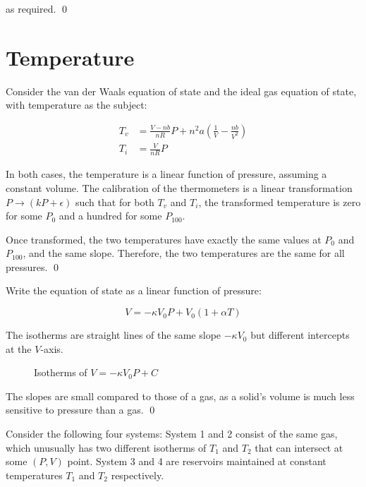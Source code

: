 \documentclass[12pt]{article}
\begin{document}
as required.
\qed


\pagebreak
\section*{Temperature}


Consider the van der Waals equation of state and the ideal gas equation of state, with temperature as the subject:

\begin{equation}
    \begin{split}
        T_{v} &= \frac{V - nb}{nR} P + n^{2}a \left( \frac{1}{V} - \frac{nb}{V^{2}} \right) \\
        T_{i} &= \frac{V}{nR} P
    \end{split}
\end{equation}

In both cases, the temperature is a linear function of pressure, assuming a constant volume. The calibration of the thermometers is a linear transformation $P \to (kP + \epsilon)$ such that for both $T_{v}$ and $T_{i}$, the transformed temperature is zero for some $P_{0}$ and a hundred for some $P_{100}$.

Once transformed, the two temperatures have exactly the same values at $P_{0}$ and $P_{100}$, and the same slope. Therefore, the two temperatures are the same for all pressures.
\qed


Write the equation of state as a linear function of pressure:

\begin{equation}
    V = -\kappa V_{0} P + V_{0} (1 + \alpha T)
\end{equation}

The isotherms are straight lines of the same slope $-\kappa V_{0}$ but different intercepts at the $V$-axis.


\begin{figure}[h]
    \centering
    
    \caption{Isotherms of $V = -\kappa V_{0} P + C$}
\end{figure}

The slopes are small compared to those of a gas, as a solid's volume is much less sensitive to pressure than a gas.
\qed


Consider the following four systems: System 1 and 2 consist of the same gas, which unusually has two different isotherms of $T_{1}$ and $T_{2}$ that can intersect at some $(P, V)$ point. System 3 and 4 are reservoirs maintained at constant temperatures $T_{1}$ and $T_{2}$ respectively.
\end{document}
